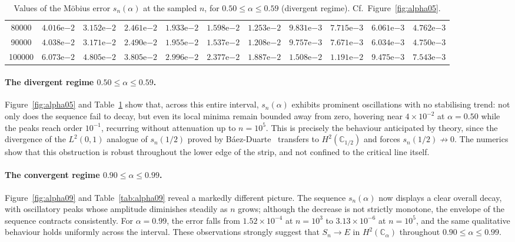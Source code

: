 \documentclass[11pt]{extarticle}
\numberwithin{equation}{section}
\theoremstyle{plain}
\theoremstyle{definition}
\begin{document}
\begin{table}[ht!]
{\begin{tabular}{|c|c|c|c|c|c|c|c|c|c|c|}
80000  & $4.016\mathrm{e}{-2}$ & $3.152\mathrm{e}{-2}$ & $2.461\mathrm{e}{-2}$ & $1.933\mathrm{e}{-2}$ & $1.598\mathrm{e}{-2}$ & $1.253\mathrm{e}{-2}$ & $9.831\mathrm{e}{-3}$ & $7.715\mathrm{e}{-3}$ & $6.061\mathrm{e}{-3}$ & $4.762\mathrm{e}{-3}$ \\
90000  & $4.038\mathrm{e}{-2}$ & $3.171\mathrm{e}{-2}$ & $2.490\mathrm{e}{-2}$ & $1.955\mathrm{e}{-2}$ & $1.537\mathrm{e}{-2}$ & $1.208\mathrm{e}{-2}$ & $9.757\mathrm{e}{-3}$ & $7.671\mathrm{e}{-3}$ & $6.034\mathrm{e}{-3}$ & $4.750\mathrm{e}{-3}$ \\
100000 & $6.073\mathrm{e}{-2}$ & $4.805\mathrm{e}{-2}$ & $3.805\mathrm{e}{-2}$ & $2.996\mathrm{e}{-2}$ & $2.377\mathrm{e}{-2}$ & $1.887\mathrm{e}{-2}$ & $1.508\mathrm{e}{-2}$ & $1.191\mathrm{e}{-2}$ & $9.475\mathrm{e}{-3}$ & $7.543\mathrm{e}{-3}$ \\
\hline
\end{tabular}}
\caption{Values of the M\"obius error $s_n(\alpha)$ at the sampled $n$, for $0.50 \leq \alpha \leq 0.59$ (divergent regime). Cf.\ Figure~\ref{fig:alpha05}.}
\label{tab:alpha05}
\end{table}


\paragraph{The divergent regime $0.50 \leq \alpha \leq 0.59$.}
Figure~\ref{fig:alpha05} and Table~\ref{tab:alpha05} show that, across this entire
interval, $s_n(\alpha)$ exhibits prominent oscillations with no stabilising trend: not only
does the sequence fail to decay, but even its local minima remain bounded away from
zero, hovering near $4 \times 10^{-2}$ at $\alpha = 0.50$ while the peaks reach
order $10^{-1}$, recurring without attenuation up to $n = 10^5$. This is precisely
the behaviour anticipated by theory, since the divergence of the $L^2(0,1)$ analogue
of $s_n(1/2)$ proved by B\'aez-Duarte~\cite{baez-unitary} transfers to
$H^2(\mathbb{C}_{1/2})$ and forces $s_n(1/2) \not\to 0$. The numerics
show that this obstruction is robust throughout the lower edge of the strip, and not
confined to the critical line itself.

\paragraph{The convergent regime $0.90 \leq \alpha \leq 0.99$.}
Figure~\ref{fig:alpha09} and Table~\ref{tab:alpha09} reveal a markedly different
picture. The sequence $s_n(\alpha)$ now displays a clear overall decay, with oscillatory
peaks whose amplitude diminishes steadily as $n$ grows; although the decrease is
not strictly monotone, the envelope of the sequence contracts consistently. For
$\alpha = 0.99$, the error falls from $1.52 \times 10^{-4}$ at $n = 10^3$ to
$3.13 \times 10^{-6}$ at $n = 10^5$, and the same qualitative behaviour holds
uniformly across the interval. These observations strongly suggest that
$S_n \to E$ in $H^2(\mathbb{C}_\alpha)$ throughout $0.90 \leq \alpha \leq 0.99$.
\end{document}
